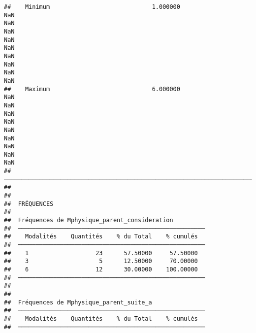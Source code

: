 \documentclass[
]{article}
\begin{document}
\begin{verbatim}
##    Minimum                             1.000000                         NaN                                                                  NaN                                                                  NaN                                                                  NaN                                                                  NaN                                                                  NaN                                                                  NaN                                                                  NaN                                                                  NaN   
##    Maximum                             6.000000                         NaN                                                                  NaN                                                                  NaN                                                                  NaN                                                                  NaN                                                                  NaN                                                                  NaN                                                                  NaN                                                                  NaN   
##  ──────────────────────────────────────────────────────────────────────────────────────────────────────────────────────────────────────────────────────────────────────────────────────────────────────────────────────────────────────────────────────────────────────────────────────────────────────────────────────────────────────────────────────────────────────────────────────────────────────────────────────────────────────────────────────────────────────────────────────────────────────────────────────────────────────────────────────────────────────────────────────────────────────────────────────────────────────────────────── 
## 
## 
##  FRÉQUENCES
## 
##  Fréquences de Mphysique_parent_consideration          
##  ───────────────────────────────────────────────────── 
##    Modalités    Quantités    % du Total    % cumulés   
##  ───────────────────────────────────────────────────── 
##    1                   23      57.50000     57.50000   
##    3                    5      12.50000     70.00000   
##    6                   12      30.00000    100.00000   
##  ───────────────────────────────────────────────────── 
## 
## 
##  Fréquences de Mphysique_parent_suite_a                
##  ───────────────────────────────────────────────────── 
##    Modalités    Quantités    % du Total    % cumulés   
##  ───────────────────────────────────────────────────── 

\end{verbatim}
\end{document}
